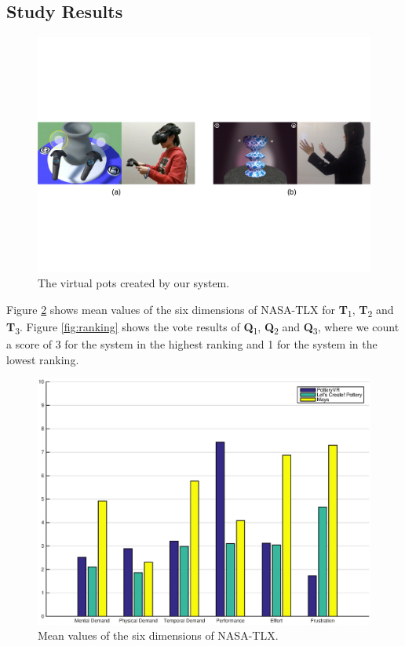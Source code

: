 \documentclass{svjour3}                     %
\begin{document}
\subsection{Study Results}
\label{sec:6.4}

\begin{figure}
\includegraphics[width=\textwidth]{fig13}
\caption{The virtual pots created by our system.}
\label{fig:1}
\end{figure}

Figure \ref{fig:tlx} shows mean values of the six dimensions of NASA-TLX for \textbf{T}\textsubscript{1}, \textbf{T}\textsubscript{2} and \textbf{T}\textsubscript{3}.
Figure \ref{fig:ranking} shows the vote results of \textbf{Q}\textsubscript{1}, \textbf{Q}\textsubscript{2} and \textbf{Q}\textsubscript{3}, where we count a score of 3 for the system in the highest ranking and 1 for the system in the lowest ranking. 

\begin{figure}
	\includegraphics[width=\textwidth]{fig14.eps}
	\caption{Mean values of the six dimensions of NASA-TLX.}
	\label{fig:tlx}
\end{figure}
\end{document}
